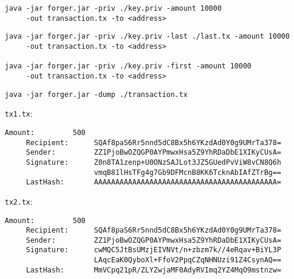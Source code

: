 \documentclass[../documentation.tex]{subfiles}
\begin{document}
\begin{lstlisting}[style=generic]
java -jar forger.jar -priv ./key.priv -amount 10000
     -out transaction.tx -to <address>
\end{lstlisting}

\begin{lstlisting}[style=generic]
java -jar forger.jar -priv ./key.priv -last ./last.tx -amount 10000
     -out transaction.tx -to <address>

java -jar forger.jar -priv ./key.priv -first -amount 10000
     -out transaction.tx -to <address>
\end{lstlisting}

\begin{lstlisting}[style=generic]
java -jar forger.jar -dump ./transaction.tx
\end{lstlisting}


\texttt{tx1.tx}:

\begin{lstlisting}[style=generic]
     Amount:         500
     Recipient:      SQAf8paS6Rr5nnd5dC8Bx5h6YKzdAd0Y0g9UMrTa378=
     Sender:         ZZ1PjoBwOZQGP0AYPmwxHsa5Z9YhRDaDbE1XIKyCUsA=
     Signature:      Z0n8TA1zenp+U0ONzSAJLot3JZ5GUedPvViW8vCN8Q6h
                     vmqB81lHsTFg4g7Gb9DFMcnB8KK6TcknAbIAfZTrBg==
     LastHash:       AAAAAAAAAAAAAAAAAAAAAAAAAAAAAAAAAAAAAAAAAAA=
\end{lstlisting}

\texttt{tx2.tx}:

\begin{lstlisting}[style=generic]
     Amount:         500
     Recipient:      SQAf8paS6Rr5nnd5dC8Bx5h6YKzdAd0Y0g9UMrTa378=
     Sender:         ZZ1PjoBwOZQGP0AYPmwxHsa5Z9YhRDaDbE1XIKyCUsA=
     Signature:      cwMQC5JtBsUMzjEIVNVt/n+zbzm7k//4eRqav+BiYL3P
                     LAqcEaK0QyboXl+FfoV2PpqCZqNHNUzi91Z4CsynAQ==
     LastHash:       MmVCpq21pR/ZLYZwjaMF0AdyRVImq2YZ4MqO9mstnzw=
\end{lstlisting}
\end{document}
